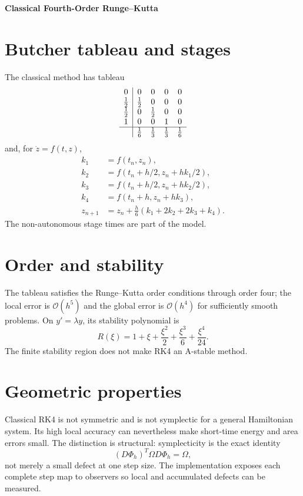 \documentclass[11pt,a4paper]{article}
\begin{document}
\begin{center}
 {\LARGE\bfseries\color{gcblue}Classical Fourth-Order Runge--Kutta}\par
 \vspace{0.35em}{\large Four-stage explicit integration}
\end{center}

\section{Butcher tableau and stages}

The classical method has tableau
\[
\begin{array}{c|cccc}
0&0&0&0&0\\
\tfrac12&\tfrac12&0&0&0\\
\tfrac12&0&\tfrac12&0&0\\
1&0&0&1&0\\ \hline
&\tfrac16&\tfrac13&\tfrac13&\tfrac16
\end{array}
\]
and, for $\dot z=f(t,z)$,
\begin{align}
k_1&=f(t_n,z_n),\\
k_2&=f(t_n+h/2,z_n+hk_1/2),\\
k_3&=f(t_n+h/2,z_n+hk_2/2),\\
k_4&=f(t_n+h,z_n+hk_3),\\
z_{n+1}&=z_n+\frac h6(k_1+2k_2+2k_3+k_4).
\end{align}
The non-autonomous stage times are part of the model.

\section{Order and stability}

The tableau satisfies the Runge--Kutta order conditions through order four;
the local error is $\mathcal O(h^5)$ and the global error is $\mathcal O(h^4)$
for sufficiently smooth problems.  On $y'=\lambda y$, its stability polynomial
is
\[
R(\xi)=1+\xi+\frac{\xi^2}{2}+\frac{\xi^3}{6}+\frac{\xi^4}{24}.
\]
The finite stability region does not make RK4 an A-stable method.

\section{Geometric properties}

Classical RK4 is not symmetric and is not symplectic for a general Hamiltonian
system.  Its high local accuracy can nevertheless make short-time energy and
area errors small.  The distinction is structural: symplecticity is the exact
identity
\[
(D\Phi_h)^T\Omega D\Phi_h=\Omega,
\]
not merely a small defect at one step size.  The implementation exposes each
complete step map to observers so local and accumulated defects can be
measured.
\end{document}
